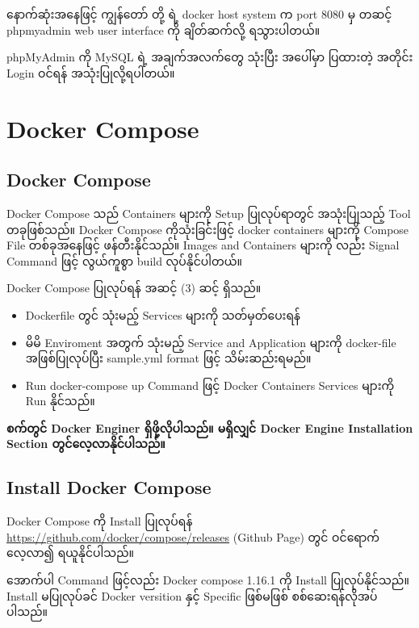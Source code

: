 နောက်ဆုံးအနေဖြင့် ကျွန်တော် တို့ ရဲ့ docker host system က port 8080 မှ
တဆင့် phpmyadmin web user interface ကို ချိတ်ဆက်လို့ ရသွားပါတယ်။

phpMyAdmin ကို MySQL ရဲ့ အချက်အလက်တွေ သုံးပြီး အပေါ်မှာ ပြထားတဲ့ အတိုင်း
Login ဝင်ရန် အသုံးပြုလို့ရပါတယ်။

\pagebreak

\hypertarget{docker-compose}{%
\section{Docker Compose}\label{docker-compose}}

\hypertarget{docker-compose-1}{%
\subsection{Docker Compose}\label{docker-compose-1}}

Docker Compose သည် Containers များကို Setup ပြုလုပ်ရာတွင် အသုံးပြုသည့်
Tool တခုဖြစ်သည်။ Docker Compose ကိုသုံးခြင်းဖြင့် docker containers
များကို Compose File တစ်ခုအနေဖြင့် ဖန်တီးနိုင်သည်။ Images and Containers
များကို လည်း Signal Command ဖြင့် လွယ်ကူစွာ build လုပ်နိုင်ပါတယ်။

Docker Compose ပြုလုပ်ရန် အဆင့် (3) ဆင့် ရှိသည်။

\begin{itemize}
\tightlist
\item
  Dockerfile တွင် သုံးမည့် Services များကို သတ်မှတ်ပေးရန်
\item
  မိမိ Enviroment အတွက် သုံးမည့် Service and Application များကို
  docker-file အဖြစ်ပြုလုပ်ပြီး sample.yml format ဖြင့် သိမ်းဆည်းရမည်။
\item
  Run docker-compose up Command ဖြင့် Docker Containers Services များကို
  Run နိုင်သည်။
\end{itemize}

\textbf{စက်တွင် Docker Enginer ရှိဖို့လိုပါသည်။ မရှိလျှင် Docker Engine
Installation Section တွင်လေ့လာနိုင်ပါသည်။}

\hypertarget{install-docker-compose}{%
\subsection{Install Docker Compose}\label{install-docker-compose}}

Docker Compose ကို Install ပြုလုပ်ရန်
\url{https://github.com/docker/compose/releases} (Github Page) တွင်
ဝင်ရောက်လေ့လာ၍ ရယူနိုင်ပါသည်။

အောက်ပါ Command ဖြင့်လည်း Docker compose 1.16.1 ကို Install
ပြုလုပ်နိုင်သည်။ Install မပြုလုပ်ခင် Docker versition နှင့် Specific
ဖြစ်မဖြစ် စစ်ဆေးရန်လိုအပ်ပါသည်။

